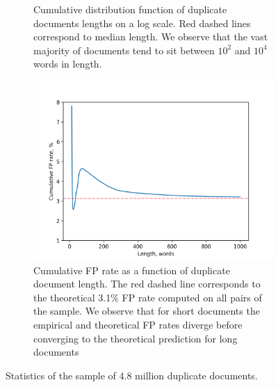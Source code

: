 \documentclass{article}
\begin{document}
\begin{figure}[!htb] %
    \centering
    \begin{subfigure}{0.45\textwidth}
        \vspace{-6ex}
        \caption{Cumulative distribution function of duplicate documents lengths on a log scale. Red dashed lines correspond to median length. We observe that the vast majority of documents tend to sit between $10^2$ and $10^4$ words in length.}
        \label{fig:dup-len}
    \end{subfigure}
    \hfill
    \begin{subfigure}{0.45\textwidth}
        \includegraphics[width=\textwidth]{figures/lsh_0.4_FP_vs_words.png}
        \caption{Cumulative FP rate as a function of duplicate document length. The red dashed line corresponds to the theoretical 3.1\% FP rate computed on all pairs of the sample. We observe that for short documents the empirical and theoretical FP rates diverge before converging to the theoretical prediction for long documents}
        \label{fig:FP-len}
    \end{subfigure}
    \caption{Statistics of the sample of 4.8 million duplicate documents.}
\end{figure}




\end{document}
